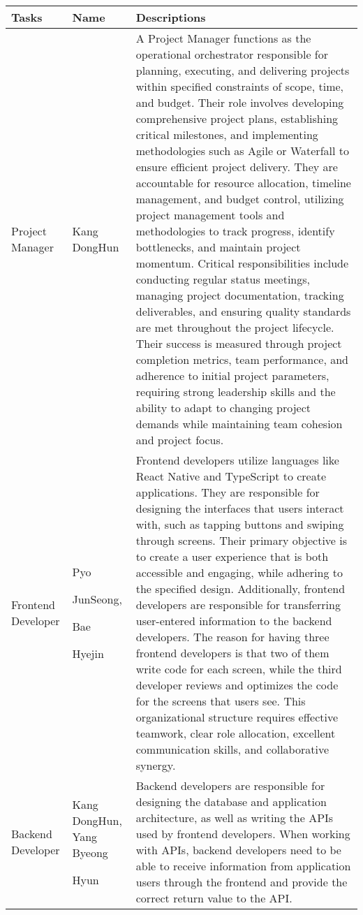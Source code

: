 \documentclass[conference]{IEEEtran}
\begin{document}
\begin{enumerate}
\begin{itemize}
\begin{itemize}
\begin{enumerate}
\begin{table}[h]
\begin{tabular}{|p{1.2cm}|p{1.2cm}|p{5.4cm}|}
    \hline
    Tasks & Name & Descriptions \\
    \hline
    Project Manager & Kang DongHun & A Project Manager functions as the operational orchestrator responsible for planning, executing, and delivering projects within specified constraints of scope, time, and budget. Their role involves developing comprehensive project plans, establishing critical milestones, and implementing methodologies such as Agile or Waterfall to ensure efficient project delivery. They are accountable for resource allocation, timeline management, and budget control, utilizing project management tools and methodologies to track progress, identify bottlenecks, and maintain project momentum. Critical responsibilities include conducting regular status meetings, managing project documentation, tracking deliverables, and ensuring quality standards are met throughout the project lifecycle. Their success is measured through project completion metrics, team performance, and adherence to initial project parameters, requiring strong leadership skills and the ability to adapt to changing project demands while maintaining team cohesion and project focus.  \\ 
    \hline
    Frontend Developer & Pyo \par JunSeong, \par Bae \par Hyejin & Frontend developers utilize languages like React Native and TypeScript to create applications. They are responsible for designing the interfaces that users interact with, such as tapping buttons and swiping through screens. Their primary objective is to create a user experience that is both accessible and engaging, while adhering to the specified design. Additionally, frontend developers are responsible for transferring user-entered information to the backend developers. The reason for having three frontend developers is that two of them write code for each screen, while the third developer reviews and optimizes the code for the screens that users see. This organizational structure requires effective teamwork, clear role allocation, excellent communication skills, and collaborative synergy. \\
    \hline
    Backend Developer & Kang DongHun,  Yang Byeong \par Hyun & Backend developers are responsible for designing the database and application architecture, as well as writing the APIs used by frontend developers. When working with APIs, backend developers need to be able to receive information from application users through the frontend and provide the correct return value to the API. \\
    \hline
\end{tabular}
\end{table}


\end{enumerate}
\end{itemize}
\end{itemize}
\end{enumerate}
\end{document}
